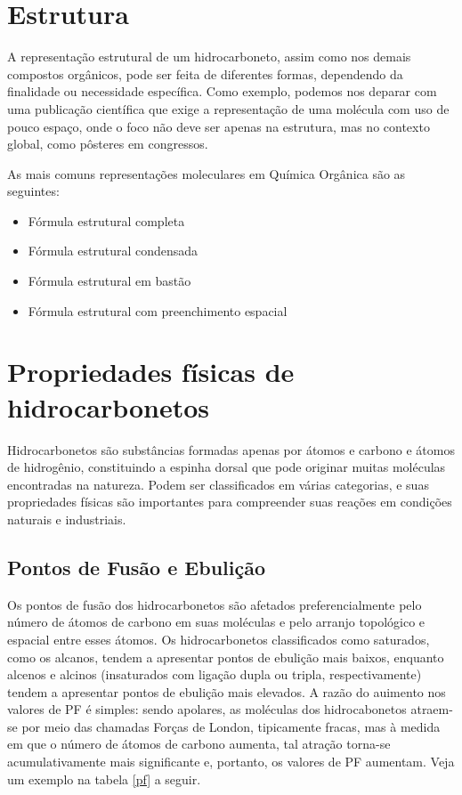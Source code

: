\section{Estrutura}
A representação estrutural de um hidrocarboneto, assim como nos demais compostos orgânicos, pode ser feita de diferentes formas, dependendo da finalidade ou necessidade específica. Como exemplo, podemos nos deparar com uma publicação científica que exige a representação de uma molécula com uso de pouco espaço, onde o foco não deve ser apenas na estrutura, mas no contexto global, como pôsteres em congressos.

As mais comuns representações moleculares em Química Orgânica são as seguintes:
\begin{itemize}
\item Fórmula estrutural completa
\item Fórmula estrutural condensada
\item Fórmula estrutural em bastão
\item Fórmula estrutural com preenchimento espacial
\end{itemize}

\section{Propriedades físicas de hidrocarbonetos}
Hidrocarbonetos são substâncias formadas apenas por átomos e carbono e átomos de hidrogênio, constituindo a espinha dorsal que pode originar muitas moléculas encontradas na natureza. Podem ser classificados em várias categorias, e suas propriedades físicas são importantes para compreender suas reações em condições naturais e industriais.

\subsection{Pontos de Fusão e Ebulição}

Os pontos de fusão dos hidrocarbonetos são afetados preferencialmente pelo número de átomos de carbono em suas moléculas e pelo arranjo topológico e espacial entre esses átomos. Os hidrocarbonetos classificados como saturados, como os alcanos, tendem a apresentar pontos de ebulição mais baixos, enquanto alcenos e alcinos (insaturados com ligação dupla ou tripla, respectivamente) tendem a apresentar pontos de ebulição mais elevados. A razão do auimento nos valores de PF é simples: sendo apolares, as moléculas dos hidrocabonetos atraem-se por meio das chamadas Forças de London, tipicamente fracas, mas à medida em que o número de átomos de carbono aumenta, tal atração torna-se acumulativamente mais significante e, portanto, os valores de PF aumentam. Veja um exemplo na tabela \ref*{pf} a seguir.

